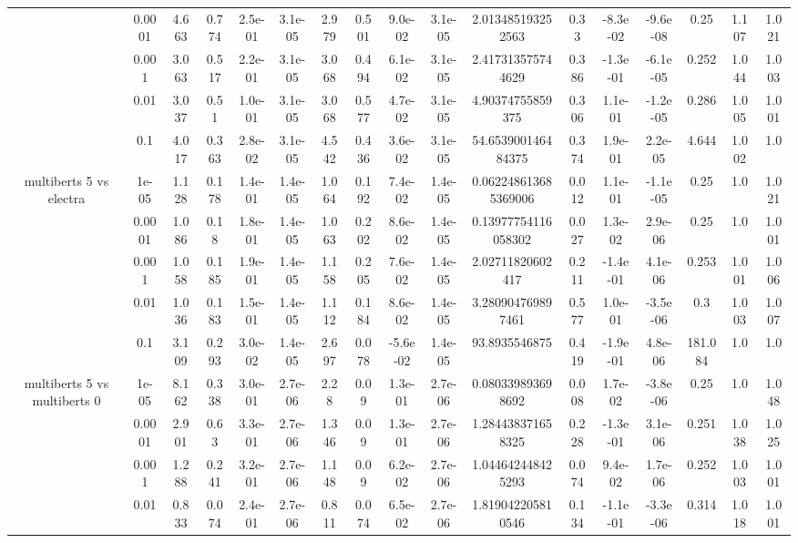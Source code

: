 \begin{tabular}{|c|c|c|c|c|c|c|c|c|c|c|c|c|c|c|c|c|}
 & 0.0001 & 4.663 & 0.774 & 2.5e-01 & 3.1e-05 & 2.979 & 0.501 & 9.0e-02 & 3.1e-05 & 2.013485193252563 & 0.33 & -8.3e-02 & -9.6e-08 & 0.25 & 1.107 & 1.021 \\
 & 0.001 & 3.063 & 0.517 & 2.2e-01 & 3.1e-05 & 3.068 & 0.494 & 6.1e-02 & 3.1e-05 & 2.417313575744629 & 0.386 & -1.3e-01 & -6.1e-05 & 0.252 & 1.044 & 1.003 \\
 & 0.01 & 3.037 & 0.51 & 1.0e-01 & 3.1e-05 & 3.068 & 0.577 & 4.7e-02 & 3.1e-05 & 4.90374755859375 & 0.306 & 1.1e-01 & -1.2e-05 & 0.286 & 1.005 & 1.001 \\
 & 0.1 & 4.017 & 0.363 & 2.8e-02 & 3.1e-05 & 4.542 & 0.436 & 3.6e-02 & 3.1e-05 & 54.653900146484375 & 0.374 & 1.9e-01 & 2.2e-05 & 4.644 & 1.002 & 1.0 \\
\hline
\multirow{5}{*}{multiberts 5 vs electra } & 1e-05 & 1.128 & 0.178 & 1.4e-01 & 1.4e-05 & 1.064 & 0.192 & 7.4e-02 & 1.4e-05 & 0.062248613685369006 & 0.012 & 1.1e-01 & -1.1e-05 & 0.25 & 1.0 & 1.021 \\
 & 0.0001 & 1.086 & 0.18 & 1.8e-01 & 1.4e-05 & 1.063 & 0.202 & 8.6e-02 & 1.4e-05 & 0.13977754116058302 & 0.027 & 1.3e-02 & 2.9e-06 & 0.25 & 1.0 & 1.001 \\
 & 0.001 & 1.058 & 0.185 & 1.9e-01 & 1.4e-05 & 1.158 & 0.205 & 7.6e-02 & 1.4e-05 & 2.02711820602417 & 0.211 & -1.4e-01 & 4.1e-06 & 0.253 & 1.001 & 1.006 \\
 & 0.01 & 1.036 & 0.183 & 1.5e-01 & 1.4e-05 & 1.112 & 0.184 & 8.6e-02 & 1.4e-05 & 3.280904769897461 & 0.577 & 1.0e-01 & -3.5e-06 & 0.3 & 1.003 & 1.007 \\
 & 0.1 & 3.109 & 0.293 & 3.0e-02 & 1.4e-05 & 2.697 & 0.078 & -5.6e-02 & 1.4e-05 & 93.8935546875 & 0.419 & -1.9e-01 & 4.8e-06 & 181.084 & 1.0 & 1.0 \\
\hline
\multirow{5}{*}{multiberts 5 vs multiberts 0} & 1e-05 & 8.162 & 0.338 & 3.0e-01 & 2.7e-06 & 2.28 & 0.09 & 1.3e-01 & 2.7e-06 & 0.080339893698692 & 0.008 & 1.7e-02 & -3.8e-06 & 0.25 & 1.0 & 1.048 \\
 & 0.0001 & 2.901 & 0.63 & 3.3e-01 & 2.7e-06 & 1.346 & 0.09 & 1.3e-01 & 2.7e-06 & 1.284438371658325 & 0.228 & -1.3e-01 & 3.1e-06 & 0.251 & 1.038 & 1.025 \\
 & 0.001 & 1.288 & 0.241 & 3.2e-01 & 2.7e-06 & 1.148 & 0.09 & 6.2e-02 & 2.7e-06 & 1.044642448425293 & 0.074 & 9.4e-02 & 1.7e-06 & 0.252 & 1.003 & 1.001 \\
 & 0.01 & 0.833 & 0.074 & 2.4e-01 & 2.7e-06 & 0.811 & 0.074 & 6.5e-02 & 2.7e-06 & 1.819042205810546 & 0.134 & -1.1e-01 & -3.3e-06 & 0.314 & 1.018 & 1.001 \\

\end{tabular}
